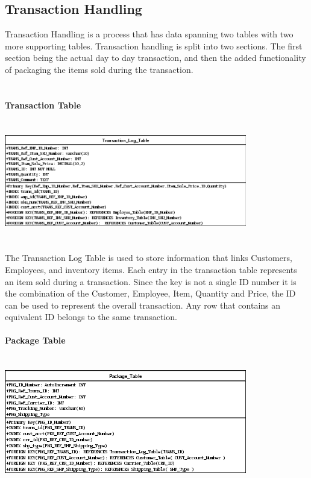 \documentclass{report}
\begin{document}
	\subsection{Transaction Handling}

	Transaction Handling is a process that has data spanning two tables with two more supporting
	tables. Transaction handling is split into two sections. The first section being the actual
	day to day transaction, and then the added functionality of packaging the items sold during
	the transaction.\\
	\\
	\\
	{\bf Transaction Table}\\
	\\
	\\
	\includegraphics{Tables/TransactionLogTable.png}\\
	\\
	\\
	The Transaction Log Table is used to store information that links Customers, Employees, and
	inventory items. Each entry in the transaction table represents an item sold during a transaction.
	Since the key is not a single ID number it is the combination of the Customer, Employee, Item,
	Quantity and Price, the ID can be used to represent the overall transaction. Any row that contains
	an equivalent ID belongs to the same transaction.
	\\
	\\
	{\bf Package Table}\\
	\\
	\\
	\includegraphics{Tables/PackageTable.png}\\
\end{document}
